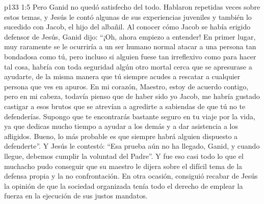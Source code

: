 \vs p133 1:5 Pero Ganid no quedó satisfecho del todo. Hablaron repetidas veces sobre estos temas, y Jesús le contó algunas de sus experiencias juveniles y también lo sucedido con Jacob, el hijo del albañil. Al conocer cómo Jacob se había erigido defensor de Jesús, Ganid dijo: “¡Oh, ahora empiezo a entender! En primer lugar, muy raramente se le ocurriría a un ser humano normal atacar a una persona tan bondadosa como tú, pero incluso si alguien fuese tan irreflexivo como para hacer tal cosa, habría con toda seguridad algún otro mortal cerca que se apresurase a ayudarte, de la misma manera que tú siempre acudes a rescatar a cualquier persona que ves en apuros. En mi corazón, Maestro, estoy de acuerdo contigo, pero en mi cabeza, todavía pienso que de haber sido yo Jacob, me habría gustado castigar a esos brutos que se atrevían a agredirte a sabiendas de que tú no te defenderías. Supongo que te encontrarás bastante seguro en tu viaje por la vida, ya que dedicas mucho tiempo a ayudar a los demás y a dar asistencia a los afligidos. Bueno, lo más probable es que siempre habrá alguien dispuesto a defenderte”. Y Jesús le contestó: “Esa prueba aún no ha llegado, Ganid, y cuando llegue, debemos cumplir la voluntad del Padre”. Y fue eso casi todo lo que el muchacho pudo conseguir que su maestro le dijera sobre el difícil tema de la defensa propia y la no confrontación. En otra ocasión, consiguió recabar de Jesús la opinión de que la sociedad organizada tenía todo el derecho de emplear la fuerza en la ejecución de sus justos mandatos.
